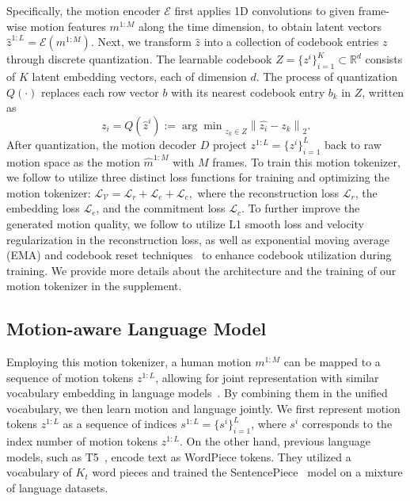 Specifically, the motion encoder $\mathcal{E}$ first applies 1D convolutions to given frame-wise motion features $m^{1:M}$ along the time dimension, to obtain latent vectors $\hat{z}^{1:L}=\mathcal{E}(m^{1:M})$. 
%
Next, we transform $\hat{z}$ into a collection of codebook entries $z$ through discrete quantization. The learnable codebook $Z=\{{z}^i\}_{i=1}^{K} \subset \mathbb{R}^{d}$ consists of $K$ latent embedding vectors, each of dimension $d$. The process of quantization $Q(\cdot)$ replaces each row vector $b$ with its nearest codebook entry $b_k$ in $Z$, written as 
\begin{equation}
z_i=Q(\hat{z}^i):={\arg \min }_{z_k \in Z}\left\|\hat{z_i}-z_k\right\|_2.
\end{equation}
After quantization, the motion decoder $D$ project ${z}^{1:L}=\{{z}^i\}_{i=1}^{L}$ back to raw motion space as the motion $\hat{m}^{1:M}$ with $M$ frames. 
%
To train this motion tokenizer, we follow \cite{chuan2022tm2t,zhang2023generating} to utilize three distinct loss functions for training and optimizing the motion tokenizer: $ \mathcal{L}_\mathcal{V} = \mathcal{L}_{r} + \mathcal{L}_{e} + \mathcal{L}_{c}\label{eq:loss:vq},$ where the reconstruction loss $\mathcal{L}_{r}$, the embedding loss $\mathcal{L}_{e}$, and the commitment loss $\mathcal{L}_{c}$. To further improve the generated motion quality, we follow \cite{zhang2023generating} to utilize L1 smooth loss and velocity regularization in the reconstruction loss, as well as exponential moving average (EMA) and codebook reset techniques~\cite{razavi2019vqvae2} to enhance codebook utilization during training. We provide more details about the architecture and the training of our motion tokenizer in the supplement.
    
\subsection{Motion-aware Language Model}
\label{sec:method:lm}

Employing this motion tokenizer, a human motion $m^{1:M}$ can be mapped to a sequence of motion tokens $z^{1:L}$, allowing for joint representation with similar vocabulary embedding in language models~\cite{kudo2018sentencepiece,raffel2020t5,ouyang2022instructgpt}. By combining them in the unified vocabulary, we then learn motion and language jointly. 
%
We first represent motion tokens $z^{1:L}$ as a sequence of indices ${s}^{1:L}=\{{s}^i\}_{i=1}^{L}$, where ${s}^i$ corresponds to the index number of motion tokens ${z}^{1:L}$. On the other hand, previous language models, such as T5~\cite{raffel2020t5}, encode text as WordPiece tokens. They utilized a vocabulary of $K_t$ word pieces and trained the SentencePiece~\cite{kudo2018sentencepiece} model on a mixture of language datasets.

